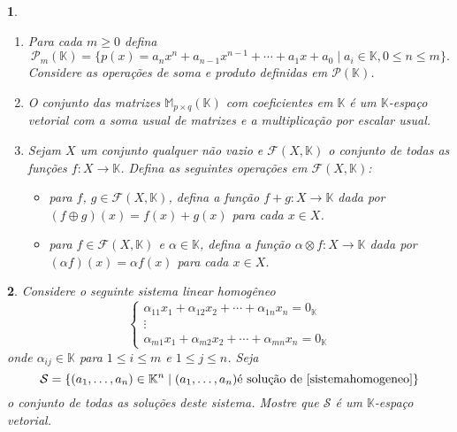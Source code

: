 \documentclass[12pt]{exam}
\newtheorem{exercicio}{}
\newcommand{\cp}[1]{\mathbb{#1}}
\begin{document}
\begin{exercicio}
\begin{enumerate}[label={\alph*})]
    \item Para cada $m \ge 0$ defina
    \[
      \mathcal{P}_m(\cp{K}) = \{ p(x) = a_nx^n + a_{n - 1}x^{n - 1} + \cdots + a_1x + a_0 \mid a_i \in \cp{K}, 0 \le n \le m \}.
    \]
    Considere as opera\c{c}\~oes de soma e produto definidas em $\mathcal{P}(\cp{K})$.

    \item O conjunto das matrizes $\cp{M}_{p \times q}(\cp{K})$ com coeficientes em $\cp{K}$ \'e um $\cp{K}$-espa\c{c}o vetorial com a soma usual de matrizes e a multiplica\c{c}\~ao por escalar usual.

    \item Sejam $X$ um conjunto qualquer n\~ao vazio e $\mathcal{F}(X, \cp{K})$ o conjunto de todas as fun\c{c}\~oes $f : X \to \cp{K}$. Defina as seguintes opera\c{c}\~oes em $\mathcal{F}(X, \cp{K})$:
    \begin{itemize}
      \item  para $f$, $g \in \mathcal{F}(X, \cp{K})$, defina a fun\c{c}\~ao $f + g : X \to \cp{K}$ dada por $(f\oplus g)(x) = f(x) + g(x)$ para cada $x \in X$.
      \item para $f \in \mathcal{F}(X, \cp{K})$ e $\alpha \in \cp{K}$, defina a fun\c{c}\~ao $\alpha \otimes f: X \to \cp{K}$ dada por $(\alpha f)(x) = \alpha f(x)$ para cada $x \in X$.
    \end{itemize}
  \end{enumerate}
\end{exercicio}

\begin{exercicio}
  Considere o seguinte sistema linear homog\^eneo
    \begin{equation}\label{sistemahomogeneo}
      \begin{cases}
        \alpha_{11}x_1 + \alpha_{12}x_2 + \cdots + \alpha_{1n}x_n = 0_\cp{K}\\
        \vdots\\
        \alpha_{m1}x_1 + \alpha_{m2}x_2 + \cdots + \alpha_{mn}x_n = 0_\cp{K}
      \end{cases}
    \end{equation}
    onde $\alpha_{ij} \in \cp{K}$ para $1 \le i \le m$ e $1 \le j \le n$. Seja 
    \[
    \mathcal{S} = \{(a_1, \dots, a_n) \in \cp{K}^n \mid (a_1, \dots, a_n) \mbox{\'e solu\c{c}\~ao de } \eqref{sistemahomogeneo}\}
    \]
    o conjunto de todas as solu\c{c}\~oes deste sistema. Mostre que $\mathcal{S}$ \'e um $\cp{K}$-espa\c{c}o vetorial.
\end{exercicio}
\end{document}
